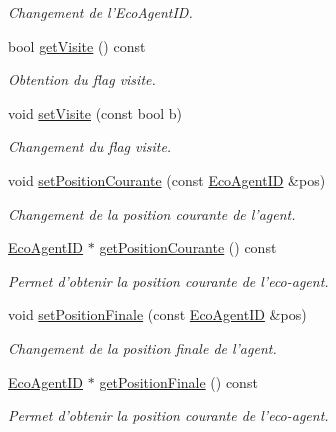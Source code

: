 \begin{CompactItemize}
\begin{CompactList}\small\item\em Changement de l'EcoAgentID. \item\end{CompactList}\item 
bool \hyperlink{classEcoAgent_8156bc22f2daca635c4f2577e6b96849}{getVisite} () const 
\begin{CompactList}\small\item\em Obtention du flag visite. \item\end{CompactList}\item 
void \hyperlink{classEcoAgent_aa8d25798a3783276c07725bce711120}{setVisite} (const bool b)
\begin{CompactList}\small\item\em Changement du flag visite. \item\end{CompactList}\item 
void \hyperlink{classEcoAgent_0365707b7bc808dd45fb34d1c076f362}{setPositionCourante} (const \hyperlink{classEcoAgentID}{EcoAgentID} \&pos)
\begin{CompactList}\small\item\em Changement de la position courante de l'agent. \item\end{CompactList}\item 
\hyperlink{classEcoAgentID}{EcoAgentID} $\ast$ \hyperlink{classEcoAgent_01733b6103c367848cb4b8477cae5e51}{getPositionCourante} () const 
\begin{CompactList}\small\item\em Permet d'obtenir la position courante de l'eco-agent. \item\end{CompactList}\item 
void \hyperlink{classEcoAgent_a0ffbb1fdb23fb5d8ad188e8f16d8c50}{setPositionFinale} (const \hyperlink{classEcoAgentID}{EcoAgentID} \&pos)
\begin{CompactList}\small\item\em Changement de la position finale de l'agent. \item\end{CompactList}\item 
\hyperlink{classEcoAgentID}{EcoAgentID} $\ast$ \hyperlink{classEcoAgent_2b5ca918f5ca154c8109022f364c275d}{getPositionFinale} () const 
\begin{CompactList}\small\item\em Permet d'obtenir la position courante de l'eco-agent. \item\end{CompactList}\item 

\end{CompactItemize}
